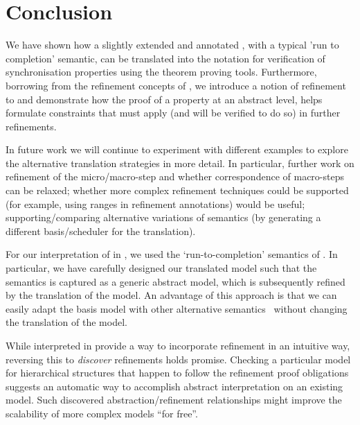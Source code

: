 
\section{Conclusion}
\label{sec:conclusion}
We have shown how a slightly extended and annotated \statechart, with a typical 'run to completion' semantic, can be translated into the \EventB notation for verification of synchronisation properties using the \EventB theorem proving tools.
Furthermore, borrowing from the refinement concepts of \EventB, we introduce a notion of refinement to \statecharts and demonstrate how the proof of a property at an abstract level, helps formulate constraints that must apply (and will be verified to do so) in further refinements.

In future work we will continue to experiment with different examples to explore the alternative translation strategies in more detail. 
In particular, further work on refinement of the micro/macro-step and whether correspondence of macro-steps can be relaxed; whether more complex refinement techniques could be supported (for example, using ranges in refinement annotations) would be useful; supporting/comparing alternative variations of semantics (by generating a different basis/scheduler for the translation).

For our interpretation of \statecharts in \mbox{\iUMLB}, we used the `run-to-completion' semantics of \statecharts.  In particular, we have carefully designed our translated model such that the semantics is captured as a generic abstract model, which is subsequently refined by the translation of the \SCXML model.  An advantage of this approach is that we can easily adapt the basis model with other alternative semantics~\mbox{\cite{Eshuis_2009}} without changing the translation of the \SCXML model. 

While \statecharts interpreted in \iUMLB provide a way to incorporate refinement in an intuitive way, reversing this to \emph{discover} refinements holds promise. 
Checking a particular \statechart model for hierarchical structures that happen to follow the refinement proof obligations suggests an automatic way to accomplish abstract interpretation on an existing model.  
Such discovered abstraction/refinement relationships might improve the scalability of more complex \statechart models ``for free''.

